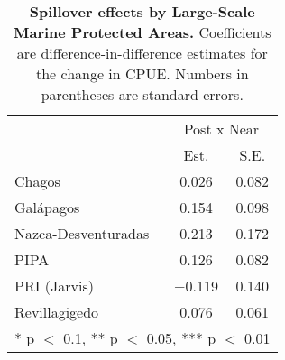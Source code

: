 \begin{table}

\caption{\label{tab:mpa_reg}\textbf{Spillover effects by Large-Scale Marine Protected Areas.} Coefficients are
             difference-in-difference estimates for the change in CPUE. Numbers in parentheses are standard errors.}
\centering
\begin{tabular}[t]{lcc}
\toprule
\multicolumn{1}{c}{ } & \multicolumn{2}{c}{Post x Near} \\
\cmidrule(l{3pt}r{3pt}){2-3}
  & Est. & S.E.\\
\midrule
Chagos & \num{0.026} & \num{0.082}\\
Galápagos & \num{0.154} & \num{0.098}\\
Nazca-Desventuradas & \num{0.213} & \num{0.172}\\
PIPA & \num{0.126} & \num{0.082}\\
PRI (Jarvis) & \num{-0.119} & \num{0.140}\\
Revillagigedo & \num{0.076} & \num{0.061}\\
\bottomrule
\multicolumn{3}{l}{\rule{0pt}{1em}* p $<$ 0.1, ** p $<$ 0.05, *** p $<$ 0.01}\\
\end{tabular}
\end{table}
